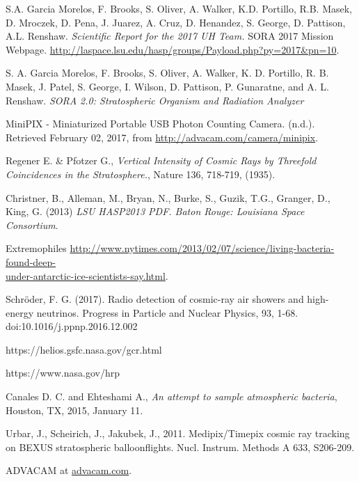 \newpage

\begin{thebibliography}{9}
S.A. Garcia Morelos, F. Brooks, S. Oliver, A. Walker, K.D. Portillo, R.B. Masek, D. Mroczek, D. Pena, J. Juarez, A. Cruz, D. Henandez, S. George, D. Pattison, A.L. Renshaw. \textit{Scientific Report for the 2017 UH Team.} SORA 2017 Mission Webpage. \url{http://laspace.lsu.edu/hasp/groups/Payload.php?py=2017&pn=10}.

  S. A. Garcia Morelos, F. Brooks, S. Oliver, A. Walker, K. D. Portillo, R. B. Masek, J. Patel, S. George, I. Wilson, D. Pattison, P. Gunaratne, and A. L. Renshaw. \textit{SORA 2.0: Stratospheric Organism and Radiation Analyzer}

  MiniPIX - Miniaturized Portable USB Photon Counting Camera. (n.d.). Retrieved February 02, 2017, from \url{http://advacam.com/camera/minipix}.

 Regener E. \& Pfotzer G., \textit{Vertical Intensity of Cosmic Rays by Threefold Coincidences in the Stratosphere.}, Nature 136, 718-719, (1935). 
  
  Christner, B., Alleman, M., Bryan, N., Burke, S., Guzik, T.G., Granger, D., King, G. (2013) \textit{LSU HASP2013 PDF. Baton Rouge: Louisiana Space Consortium}.

  Extremophiles \href{http://www.nytimes.com/2013/02/07/science/living-bacteria-found-deep-under-antarctic-ice-scientists-say.html}{http://www.nytimes.com/2013/02/07/science/living-bacteria-found-deep-\\under-antarctic-ice-scientists-say.html}.

  Schröder, F. G. (2017). Radio detection of cosmic-ray air showers and high-energy neutrinos. Progress in Particle and Nuclear Physics, 93, 1-68. doi:10.1016/j.ppnp.2016.12.002

  https://helios.gsfc.nasa.gov/gcr.html

  https://www.nasa.gov/hrp
  
 Canales D. C. and Ehteshami A., \textit{An attempt to sample atmospheric bacteria}, Houston, TX, 2015, January 11.

Urbar, J., Scheirich, J., Jakubek, J., 2011. Medipix/Timepix cosmic ray tracking on BEXUS stratospheric balloonflights. Nucl. Instrum. Methods A 633, S206-209.

  ADVACAM at \url{advacam.com}.


\end{thebibliography}
